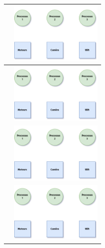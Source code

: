 \documentclass[12pt,a4paper,article,english,firamath]{nsi}
\newcommand{\truc}{4.5cm}
\begin{document}
\begin{center}
\begin{tabular}{|c|c|}
\hline
 & \includegraphics[width=\truc]{img/d6.png} \\
\hline
 & \includegraphics[width=\truc]{img/d6.png} \\
\hline
 & \includegraphics[width=\truc]{img/d6.png} \\
\hline
 & \includegraphics[width=\truc]{img/d6.png} \\

\end{tabular}
\end{center}
\end{document}

